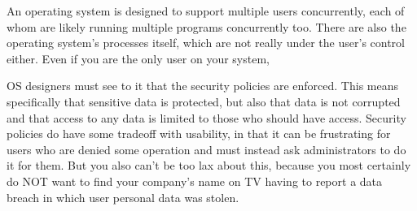 An operating system is designed to support multiple users concurrently, each of whom are likely running multiple programs concurrently too. There are also the operating system's processes itself, which are not really under the user's control either. Even if you are the only user on your system, 

OS designers must see to it that the security policies are enforced. This means specifically that sensitive data is protected, but also that data is not corrupted and that access to any data is limited to those who should have access. Security policies do have some tradeoff with usability, in that it can be frustrating for users who are denied some operation and must instead ask administrators to do it for them. But you also can't be too lax about this, because you most certainly do NOT want to find your company's name on TV having to report a data breach in which user personal data was stolen.



